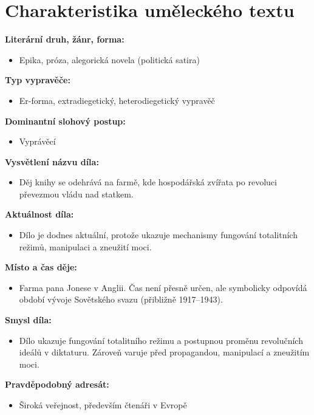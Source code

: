 \documentclass[12pt,a4paper]{article}
\begin{document}
\section*{Charakteristika uměleckého textu}

\begin{tcolorbox}[breakable]

\textbf{Literární druh, žánr, forma:}
\begin{itemize}
\item Epika, próza, alegorická novela (politická satira)
\end{itemize}

\textbf{Typ vypravěče:}
\begin{itemize}
\item Er-forma, extradiegetický, heterodiegetický vypravěč
\end{itemize}

\textbf{Dominantní slohový postup:}
\begin{itemize}
\item Vyprávěcí
\end{itemize}

\textbf{Vysvětlení názvu díla:}
\begin{itemize}
\item Děj knihy se odehrává na farmě, kde hospodářská zvířata po revoluci převezmou vládu nad statkem.
\end{itemize}

\textbf{Aktuálnost díla:}
\begin{itemize}
\item Dílo je dodnes aktuální, protože ukazuje mechanismy fungování totalitních režimů, manipulaci a zneužití moci.
\end{itemize}

\textbf{Místo a čas děje:}
\begin{itemize}
\item Farma pana Jonese v Anglii. Čas není přesně určen, ale symbolicky odpovídá období vývoje Sovětského svazu (přibližně 1917–1943).
\end{itemize}

\textbf{Smysl díla:}
\begin{itemize}
\item Dílo ukazuje fungování totalitního režimu a postupnou proměnu revolučních ideálů v diktaturu. Zároveň varuje před propagandou, manipulací a zneužitím moci.
\end{itemize}

\textbf{Pravděpodobný adresát:}
\begin{itemize}
\item Široká veřejnost, především čtenáři v Evropě
\end{itemize}


\end{tcolorbox}
\end{document}
